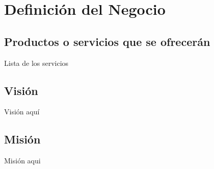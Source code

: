 \chapter{Definición del Negocio}

\section{Productos o servicios que se ofrecerán}

Lista de los servicios

\section{Visión}

Visión aquí

\section{Misión}

Misión aqui